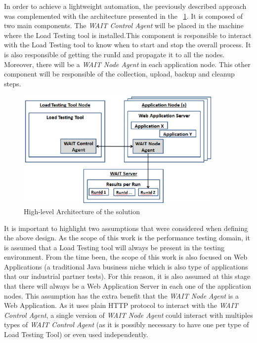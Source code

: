\documentclass[runningheads,a4paper]{llncs}
\begin{document}
In order to achieve a lightweight automation, the previously described approach
was complemented with the architecture presented in the \figurename
~\ref{fig_Arch}. It is composed of two main components. The \emph{WAIT Control
Agent} will be placed in the machine where the Load Testing tool is
installed.This component is responsible to interact with the Load Testing tool to know
when to start and stop the overall process. It is also responsible of getting 
the runId and propagate it to all the nodes. Moreover, there will be a \emph{WAIT Node Agent} 
in each application node. This other component will be responsible of the
collection, upload, backup and cleanup steps.

\begin{figure}[!h]
\centering
\includegraphics[totalheight=.3\textheight,width=0.9\textwidth]{architecture_dwait}
\caption{High-level Architecture of the solution}
\label{fig_Arch}
\end{figure}

It is important to highlight two assumptions that were considered when defining
the above design. As the scope of this work is the performance testing domain,
it is assumed that a Load Testing tool will always be present in the
testing environment. From the time been, the scope of this work is also focused
on Web Applications (a traditional Java business niche which is also type of 
applications that our industrial partner tests). For this reason, it is also
assumed at this stage that there will always be a Web Application Server in each
one of the application nodes. This assumption has the extra benefit that the
\emph{WAIT Node Agent} is a Web Application. As it uses plain HTTP protocol
to interact with the \emph{WAIT Control Agent}, a single version of \emph{WAIT
Node Agent} could interact with multiples types of \emph{WAIT Control Agent}
(as it is possibly necessary to have one per type of Load Testing Tool) or even
used independently.
\end{document}

